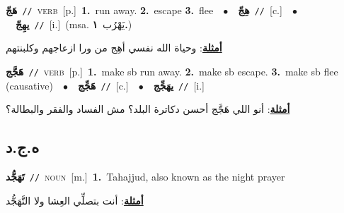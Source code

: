 \documentclass[10pt,a4paper,twoside]{article} %
\begin{document}
\begin{multicols}{2}
{\setlength\topsep{0pt}\textbf{\foreignlanguage{arabic}{هَجّ}}\ {\color{gray}\texttt{//}\color{black}}\ \textsc{verb}\ [p.]\ \textbf{1.}~run away.  \textbf{2.}~escape  \textbf{3.}~flee\ \ $\bullet$\ \ \setlength\topsep{0pt}\textbf{\foreignlanguage{arabic}{هِجّ}}\ {\color{gray}\texttt{//}\color{black}}\ [c.]\ \ $\bullet$\ \ \setlength\topsep{0pt}\textbf{\foreignlanguage{arabic}{يهِجّ}}\ {\color{gray}\texttt{//}\color{black}}\ [i.]\ \color{gray}(msa. \foreignlanguage{arabic}{يَهْرُب}~\foreignlanguage{arabic}{\textbf{١.}})\color{black}\  \begin{flushright}\color{gray}\foreignlanguage{arabic}{\textbf{\underline{\foreignlanguage{arabic}{أمثلة}}}: وحياة الله نفسي أهِج من ورا ازعاجهم وكلبنتهم}\end{flushright}\color{black}} \vspace{2mm}

{\setlength\topsep{0pt}\textbf{\foreignlanguage{arabic}{هَجَّج}}\ {\color{gray}\texttt{//}\color{black}}\ \textsc{verb}\ [p.]\ \textbf{1.}~make sb run away.  \textbf{2.}~make sb escape.  \textbf{3.}~make sb flee (causative)\ \ $\bullet$\ \ \setlength\topsep{0pt}\textbf{\foreignlanguage{arabic}{هَجِّج}}\ {\color{gray}\texttt{//}\color{black}}\ [c.]\ \ $\bullet$\ \ \setlength\topsep{0pt}\textbf{\foreignlanguage{arabic}{يهَجِّج}}\ {\color{gray}\texttt{//}\color{black}}\ [i.]\  \begin{flushright}\color{gray}\foreignlanguage{arabic}{\textbf{\underline{\foreignlanguage{arabic}{أمثلة}}}: أنو اللي هَجَّج أحسن دكاترة البلد؟ مش الفساد والفقر والبطالة؟}\end{flushright}\color{black}} \vspace{2mm}

\vspace{-3mm}
\subsection*{\color{blue}\foreignlanguage{arabic}{ه.ج.د}\color{blue}{}} 

{\setlength\topsep{0pt}\textbf{\foreignlanguage{arabic}{تَهَجُّد}}\ {\color{gray}\texttt{//}\color{black}}\ \textsc{noun}\ [m.]\ \textbf{1.}~Tahajjud, also known as the night prayer\  \begin{flushright}\color{gray}\foreignlanguage{arabic}{\textbf{\underline{\foreignlanguage{arabic}{أمثلة}}}: أنت بتصلِّي العِشا ولا التَّهَجُّد}\end{flushright}\color{black}} \vspace{2mm}


\end{multicols}
\end{document}
